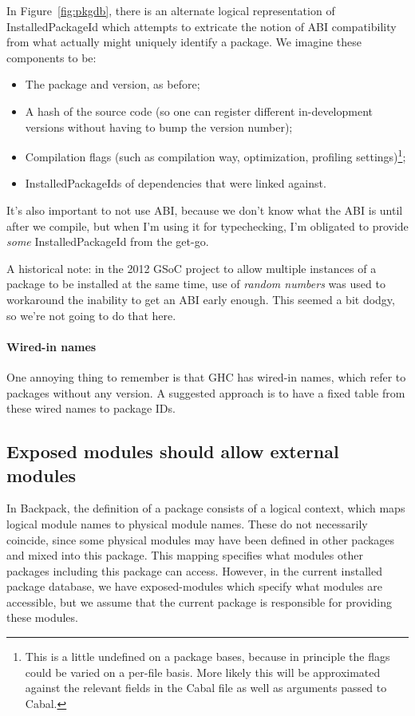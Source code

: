 \documentclass{article}
\begin{document}
In Figure~\ref{fig:pkgdb}, there is an alternate logical representation
of InstalledPackageId which attempts to extricate the notion of ABI
compatibility from what actually might uniquely identify a package.
We imagine these components to be:

\begin{itemize}
    \item The package and version, as before;
    \item A hash of the source code (so one can register different
        in-development versions without having to bump the version
        number);
    \item Compilation flags (such as compilation way, optimization,
        profiling settings)\footnote{This is a little undefined on a package bases, because in principle the flags could be varied on a per-file basis. More likely this will be approximated against the relevant fields in the Cabal file as well as arguments passed to Cabal.};
    \item InstalledPackageIds of dependencies that were linked against.
\end{itemize}

It's also important to not use ABI, because we don't know what the ABI
is until after we compile, but when I'm using it for typechecking, I'm
obligated to provide \emph{some} InstalledPackageId from the get-go.

A historical note: in the 2012 GSoC project to allow multiple instances
of a package to be installed at the same time, use of \emph{random
numbers} was used to workaround the inability to get an ABI early
enough.  This seemed a bit dodgy, so we're not going to do that here.

\paragraph{Wired-in names} One annoying thing to remember is that GHC
has wired-in names, which refer to packages without any version.  A
suggested approach is to have a fixed table from these wired names to
package IDs.

\subsection{Exposed modules should allow external modules}\label{sec:reexport}

In Backpack, the definition of a package consists of a logical context,
which maps logical module names to physical module names.  These do not
necessarily coincide, since some physical modules may have been defined
in other packages and mixed into this package.  This mapping specifies
what modules other packages including this package can access.
However, in the current installed package database, we have exposed-modules which
specify what modules are accessible, but we assume that the current
package is responsible for providing these modules.
\end{document}

